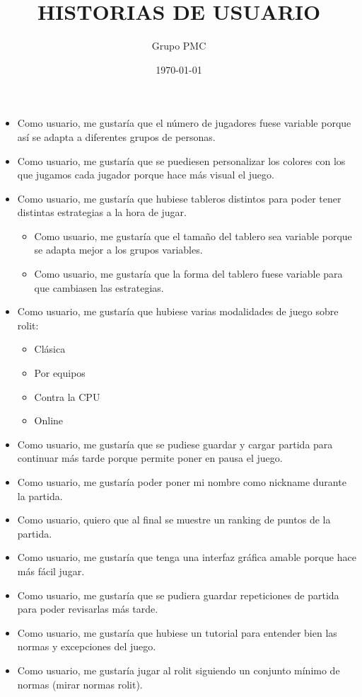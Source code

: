 \documentclass{article}
\title{HISTORIAS DE USUARIO}
\date{\today}
\author{Grupo PMC}
\begin{document}
\maketitle

\begin{itemize}
\item Como usuario, me gustaría que el número de jugadores fuese variable porque así se adapta a diferentes grupos de personas.

\item Como usuario, me gustaría que se puediesen personalizar los colores con los que jugamos cada jugador porque hace más visual el juego.

\item Como usuario, me gustaría que hubiese tableros distintos para poder tener distintas estrategias a la hora de jugar.
\begin{itemize}
	\item Como usuario, me gustaría que el tamaño del tablero sea variable porque se adapta mejor a los grupos variables.
	\item Como usuario, me gustaría que la forma del tablero fuese variable para que cambiasen las estrategias.
\end{itemize}

\item Como usuario, me gustaría que hubiese varias modalidades de juego sobre rolit:
\begin{itemize}
\item Clásica
\item Por equipos
\item Contra la CPU
\item Online
\end{itemize}

\item Como usuario, me gustaría que se pudiese guardar y cargar partida para continuar más tarde porque permite poner en pausa el juego.

\item Como usuario, me gustaría poder poner mi nombre como nickname durante la partida.

\item Como usuario, quiero que al final se muestre un ranking de puntos de la partida.

\item Como usuario, me gustaría que tenga una interfaz gráfica amable porque hace más fácil jugar.

\item Como usuario, me gustaría que se pudiera guardar repeticiones de partida para poder revisarlas más tarde.

\item Como usuario, me gustaría que hubiese un tutorial para entender bien las normas y excepciones del juego.

\item Como usuario, me gustaría jugar al rolit siguiendo un conjunto mínimo de normas (mirar normas rolit).
\end{itemize}
\end{document}
